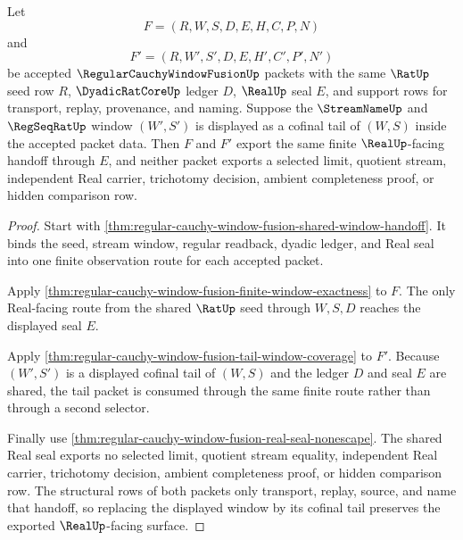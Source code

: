 \begin{theorem}
\label{thm:regular-cauchy-window-fusion-tail-stability}
Let
$$
F=(R,W,S,D,E,H,C,P,N)
$$
and
$$
F'=(R,W',S',D,E,H',C',P',N')
$$
be accepted $\RegularCauchyWindowFusionUp$ packets with the same $\RatUp$ seed row $R$, $\DyadicRatCoreUp$ ledger $D$, $\RealUp$ seal $E$, and support rows for transport, replay, provenance, and naming. Suppose the $\StreamNameUp$ and $\RegSeqRatUp$ window $(W',S')$ is displayed as a cofinal tail of $(W,S)$ inside the accepted packet data. Then $F$ and $F'$ export the same finite $\RealUp$-facing handoff through $E$, and neither packet exports a selected limit, quotient stream, independent Real carrier, trichotomy decision, ambient completeness proof, or hidden comparison row.
\end{theorem}
\begin{proof}
Start with \autoref{thm:regular-cauchy-window-fusion-shared-window-handoff}. It binds the seed, stream window, regular readback, dyadic ledger, and Real seal into one finite observation route for each accepted packet.

Apply \autoref{thm:regular-cauchy-window-fusion-finite-window-exactness} to $F$. The only Real-facing route from the shared $\RatUp$ seed through $W,S,D$ reaches the displayed seal $E$.

Apply \autoref{thm:regular-cauchy-window-fusion-tail-window-coverage} to $F'$. Because $(W',S')$ is a displayed cofinal tail of $(W,S)$ and the ledger $D$ and seal $E$ are shared, the tail packet is consumed through the same finite route rather than through a second selector.

Finally use \autoref{thm:regular-cauchy-window-fusion-real-seal-nonescape}. The shared Real seal exports no selected limit, quotient stream equality, independent Real carrier, trichotomy decision, ambient completeness proof, or hidden comparison row. The structural rows of both packets only transport, replay, source, and name that handoff, so replacing the displayed window by its cofinal tail preserves the exported $\RealUp$-facing surface.
\end{proof}

